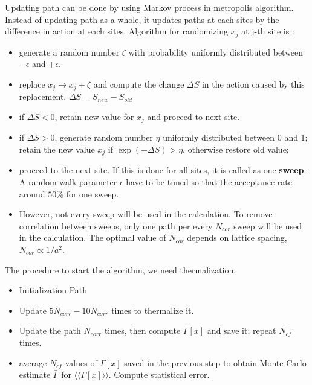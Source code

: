 \documentclass[10pt]{book}
\def\la{\langle}
\def\ra{\rangle}
\begin{document}
Updating path can be done by using Markov process in metropolis algorithm. 
Instead of updating path as a whole, it updates paths at each sites 
by the difference in action at each sites. Algorithm for randomizing $x_j$ at j-th site is :
\begin{itemize}
\item  generate a random number $\zeta $ with probability uniformly distributed between $-\epsilon$
      and $+\epsilon$.   
\item  replace $x_j\to x_j+\zeta$ and compute the change $\Delta S$ in the action
      caused by this replacement. $\Delta S=S_{new}-S_{old}$
\item  if $\Delta S<0$, retain new value for $x_j$ and proceed to next site.
\item if $\Delta S>0$, generate random number $\eta$ uniformly distributed between 0 and 1;
      retain the new value $x_j$ if $\exp(-\Delta S)>\eta $, otherwise restore
      old value; 
\item proceed to the next site. If this is done for all sites, it is called as one
      {\bf sweep}. A random walk parameter $\epsilon$ have to be tuned so that 
      the acceptance rate around $50\%$ for one sweep.
\item However, not every sweep will be used in the calculation. 
     To remove correlation between sweeps, only one path per every $N_{cor}$ sweep
     will be used in the calculation. The optimal value of $N_{cor}$ depends on 
     lattice spacing, $N_{cor}\propto 1/a^2$.             
\end{itemize} 

The procedure to start the algorithm, we need thermalization. 

\begin{itemize}
\item Initialization Path
\item Update $5 N_{corr}-10N_{corr}$ times to thermalize it.
\item Update the path $N_{corr}$ times, then compute $\Gamma[x]$ and save it;
      repeat $N_{cf}$ times.
\item average $N_{cf}$ values of $\Gamma[x]$ saved in the previous step
      to obtain Monte Carlo estimate $\bar{\Gamma}$ for $\la\la\Gamma[x]\ra\ra$. 
      Compute statistical error.       
\end{itemize}
\end{document}
